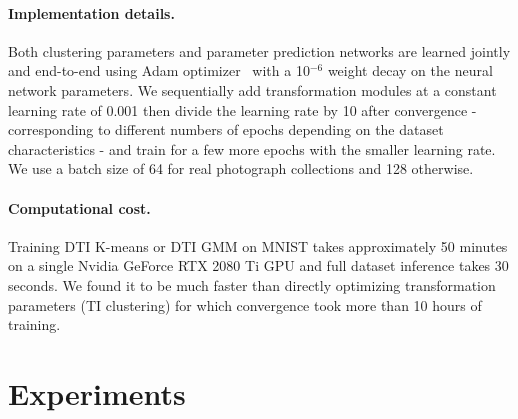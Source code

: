 \documentclass{article}
\begin{document}
\vspace{-0.7em}
\paragraph{Implementation details.} Both clustering parameters and parameter prediction 
networks are learned jointly and end-to-end using Adam 
optimizer~\cite{kingmaAdamMethodStochastic2015} with a 10$^{-6}$ weight decay on the neural 
network parameters. We sequentially add transformation modules at a constant learning rate of 
0.001 then divide the learning rate by 10 after convergence - corresponding to different 
numbers of epochs depending on the dataset characteristics - and train for a few more epochs 
with the smaller learning rate. We use a batch size of 64 for real photograph collections and 
128 otherwise.

\vspace{-0.7em}
\paragraph{Computational cost.} Training DTI K-means or DTI GMM on MNIST takes approximately 
50 minutes on a single Nvidia GeForce RTX 2080 Ti GPU and full dataset inference takes 30 
seconds. We found it to be much faster than directly optimizing transformation parameters (TI 
clustering) for which convergence took more than 10 hours of training.

\section{Experiments}\label{sec:results}
\end{document}
